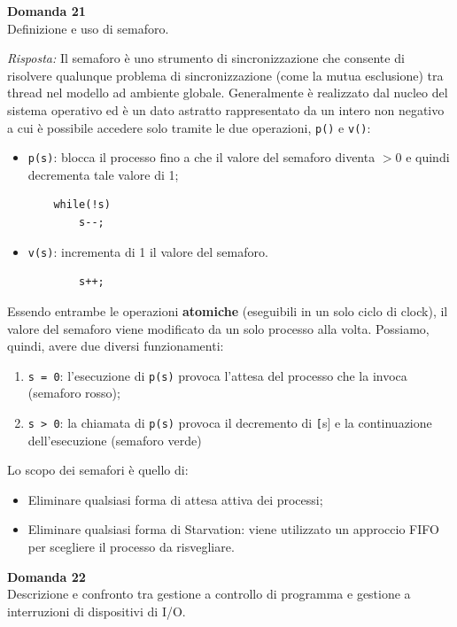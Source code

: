 \documentclass{article}
\newenvironment{problem}[2][Domanda]
    { \begin{mdframed}[backgroundcolor=gray!20] \textbf{#1 #2} \\}
    {  \end{mdframed}}
\newenvironment{solution}
    {\textit{Risposta:}}
    {}
\begin{document}
\begin{problem}{21}
Definizione e uso di semaforo.
\end{problem}
\begin{solution}
Il semaforo è uno strumento di sincronizzazione che consente di risolvere qualunque problema di sincronizzazione (come la mutua esclusione) tra thread nel modello ad ambiente globale.
\newline
Generalmente è realizzato dal nucleo del sistema operativo ed è un dato astratto rappresentato da un intero non negativo a cui è possibile accedere solo tramite le due operazioni, \texttt{p()} e \texttt{v()}:
\begin{itemize}
    \item \texttt{p(s)}: blocca il processo fino a che il valore del semaforo diventa $> 0$ e quindi decrementa tale valore di 1;
\begin{verbatim}
    while(!s)
        s--;
    \end{verbatim}
    \item \texttt{v(s)}: incrementa di 1 il valore del semaforo.  
    \begin{verbatim}
        s++;
    \end{verbatim}
\end{itemize}
Essendo entrambe le operazioni \textbf{atomiche} (eseguibili in un solo ciclo di clock), il valore del semaforo viene modificato da un solo processo alla volta.
Possiamo, quindi, avere due diversi funzionamenti:  
\begin{enumerate}
    \item \texttt{s = 0}: l’esecuzione di \texttt{p(s)} provoca l’attesa del processo che la invoca (semaforo rosso);
    \item \texttt{s > 0}: la chiamata di \texttt{p(s)} provoca il decremento di \texttt[s] e la continuazione dell’esecuzione (semaforo verde)
\end{enumerate}
Lo scopo dei semafori è quello di:
\begin{itemize}
    \item Eliminare qualsiasi forma di attesa attiva dei processi;
    \item Eliminare qualsiasi forma di Starvation: viene utilizzato un approccio FIFO per scegliere il processo da risvegliare.
\end{itemize}
\end{solution}
\begin{problem}{22}
Descrizione e confronto tra gestione a controllo di programma e gestione a interruzioni di dispositivi di I/O.
\end{problem}
\end{document}
